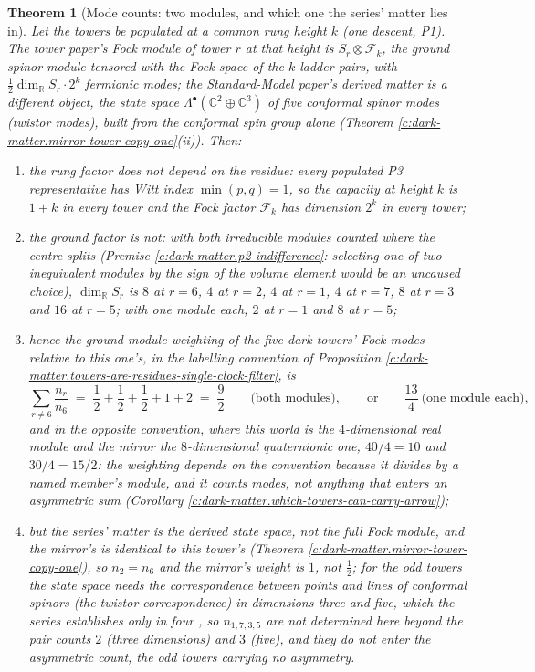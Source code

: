 \documentclass[11pt]{article}
\newtheorem{theorem}{Theorem}[section]
\theoremstyle{definition}
\theoremstyle{plain}
\newcommand{\changedmark}[2]{\marginpar{\raggedright\scriptsize\color{#1}#2}}
\providecommand{\C}{}\renewcommand{\C}{\mathbb{C}}
\providecommand{\R}{}\renewcommand{\R}{\mathbb{R}}
\begin{document}
\begin{theorem}[Mode counts: two modules, and which one the series' matter lies in]\label{c:dark-matter.mode-counts-two-modules-which-one}
\changedmark{gray}{reworded}
Let the towers be populated at a common rung height $k$ (one descent, P1). The tower paper's Fock module of tower $r$ at that height is $S_{r} \otimes \mathcal{F}_{k}$, the ground spinor module tensored with the Fock space of the $k$ ladder pairs, with $\tfrac{1}{2}\dim_{\R} S_{r} \cdot 2^{k}$ fermionic modes; the Standard-Model paper's derived matter is a different object, the state space $\Lambda^{\bullet}(\C^{2} \oplus \C^{3})$ of five conformal spinor modes (twistor modes), built from the conformal spin group alone (Theorem \ref{c:dark-matter.mirror-tower-copy-one}(ii)). Then:
\begin{enumerate}
\item[(i)] the rung factor does not depend on the residue: every populated P3 representative has Witt index $\min(p,q) = 1$, so the capacity at height $k$ is $1 + k$ in every tower \cite[Thm.~4.3]{ButlerT3} and the Fock factor $\mathcal{F}_{k}$ has dimension $2^{k}$ in every tower;
\item[(ii)] the ground factor is not: with both irreducible modules counted where the centre splits (Premise \ref{c:dark-matter.p2-indifference}: selecting one of two inequivalent modules by the sign of the volume element would be an uncaused choice), $\dim_{\R} S_{r}$ is $8$ at $r = 6$, $4$ at $r = 2$, $4$ at $r = 1$, $4$ at $r = 7$, $8$ at $r = 3$ and $16$ at $r = 5$; with one module each, $2$ at $r = 1$ and $8$ at $r = 5$;
\item[(iii)] hence the ground-module weighting of the five dark towers' Fock modes relative to this one's, in the labelling convention of Proposition \ref{c:dark-matter.towers-are-residues-single-clock-filter}, is
\[
\sum_{r \neq 6} \frac{n_{r}}{n_{6}} \;=\; \frac{1}{2} + \frac{1}{2} + \frac{1}{2} + 1 + 2 \;=\; \frac{9}{2} \qquad\text{(both modules)},\qquad\text{or}\qquad \frac{13}{4}\ \text{(one module each)},
\]
and in the opposite convention, where this world is the $4$-dimensional real module and the mirror the $8$-dimensional quaternionic one, $40/4 = 10$ and $30/4 = 15/2$: the weighting depends on the convention because it divides by a named member's module, and it counts modes, not anything that enters an asymmetric sum (Corollary \ref{c:dark-matter.which-towers-can-carry-arrow});
\item[(iv)] but the series' matter is the derived state space, not the full Fock module, and the mirror's is identical to this tower's (Theorem \ref{c:dark-matter.mirror-tower-copy-one}), so $n_{2} = n_{6}$ and the mirror's weight is $1$, not $\tfrac{1}{2}$; for the odd towers the state space needs the correspondence between points and lines of conformal spinors (the twistor correspondence) in dimensions three and five, which the series establishes only in four \cite{ButlerT9}, so $n_{1,7,3,5}$ are not determined here beyond the pair counts $2$ (three dimensions) and $3$ (five), and they do not enter the asymmetric count, the odd towers carrying no asymmetry.

\end{enumerate}
\end{theorem}
\end{document}
